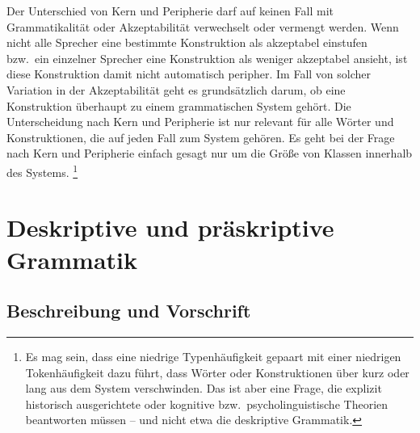 

Der Unterschied von Kern und Peripherie darf auf keinen Fall mit Grammatikalität oder Akzeptabilität verwechselt oder vermengt werden.
Wenn nicht alle Sprecher eine bestimmte Konstruktion als akzeptabel einstufen bzw.\ ein einzelner Sprecher eine Konstruktion als weniger akzeptabel ansieht, ist diese Konstruktion damit nicht automatisch peripher.
Im Fall von solcher Variation in der Akzeptabilität geht es grundsätzlich darum, ob eine Konstruktion überhaupt zu einem grammatischen System gehört.
Die Unterscheidung nach Kern und Peripherie ist nur relevant für alle Wörter und Konstruktionen, die auf jeden Fall zum System gehören.
Es geht bei der Frage nach Kern und Peripherie einfach gesagt nur um die Größe von Klassen innerhalb des Systems.%
\footnote{Es mag sein, dass eine niedrige Typenhäufigkeit gepaart mit einer niedrigen Tokenhäufigkeit dazu führt, dass Wörter oder Konstruktionen über kurz oder lang aus dem System verschwinden.
Das ist aber eine Frage, die explizit historisch ausgerichtete oder kognitive bzw.\ psycholinguistische Theorien beantworten müssen -- und nicht etwa die deskriptive Grammatik.}




\section{Deskriptive und präskriptive Grammatik}
\label{sec:deskriptiveundpraeskriptivegrammatik}

\subsection{Beschreibung und Vorschrift}
\label{sec:beschreibungundvorschrift}

